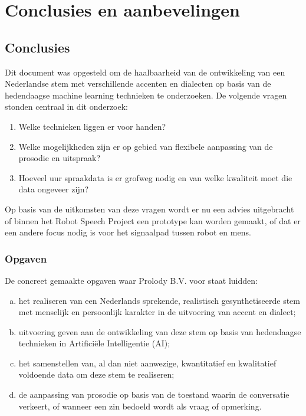 \chapter{Conclusies en aanbevelingen}

\begin{center}
  \begin{minipage}{0.5\textwidth}
    \begin{small}
    \end{small}
  \end{minipage}
  \vspace{0.5cm}
\end{center}

\section{Conclusies}
Dit document was opgesteld om de haalbaarheid van de ontwikkeling van een Nederlandse stem met verschillende accenten en dialecten op basis van de hedendaagse machine learning technieken te onderzoeken. De volgende vragen stonden centraal in dit onderzoek:
\begin{enumerate}
    \item Welke technieken liggen er voor handen?
    \item Welke mogelijkheden zijn er op gebied van flexibele aanpassing van de prosodie en uitspraak?
    \item Hoeveel uur spraakdata is er grofweg nodig en van welke kwaliteit moet die data ongeveer zijn?
\end{enumerate}

Op basis van de uitkomsten van deze vragen wordt er nu een advies uitgebracht of binnen het Robot Speech Project een prototype kan worden gemaakt, of dat er een andere focus nodig is voor het signaalpad tussen robot en mens.

\subsection{Opgaven}
De concreet gemaakte opgaven waar Prolody B.V. voor staat luidden:
\begin{enumerate}[a)]
    \item het realiseren van een Nederlands sprekende, realistisch gesynthetiseerde stem met menselijk en persoonlijk karakter in de uitvoering van accent en dialect;
    \item uitvoering geven aan de ontwikkeling van deze stem op basis van hedendaagse technieken in Artificiële Intelligentie (AI);
    \item het samenstellen van, al dan niet aanwezige, kwantitatief en kwalitatief voldoende data om deze stem te realiseren;
    \item de aanpassing van prosodie op basis van de toestand waarin de conversatie verkeert, of wanneer een zin bedoeld wordt als vraag of opmerking.
\end{enumerate}

